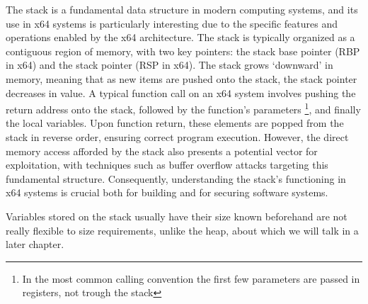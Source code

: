 \documentclass{article}
\begin{document}
The stack is a fundamental data structure in modern computing systems, and its
use in x64 systems is particularly interesting due to the specific features and
operations enabled by the x64 architecture. The stack is typically organized as
a contiguous region of memory, with two key pointers: the stack base pointer
(RBP in x64) and the stack pointer (RSP in x64). The stack grows `downward' in
memory, meaning that as new items are pushed onto the stack, the stack pointer
decreases in value. A typical function call on an x64 system involves pushing
the return address onto the stack, followed by the function's parameters
\footnote{In the most common calling convention the first few parameters are
passed in registers, not trough the stack}, and finally the local variables.
Upon function return, these elements are popped from the stack in reverse order,
ensuring correct program execution. However, the direct memory access afforded
by the stack also presents a potential vector for exploitation, with techniques
such as buffer overflow attacks targeting this fundamental structure.
Consequently, understanding the stack's functioning in x64 systems is crucial
both for building and for securing software systems.

Variables stored on the stack usually have their size known beforehand are not
really flexible to size requirements, unlike the heap, about which we will talk
in a later chapter.
\end{document}
